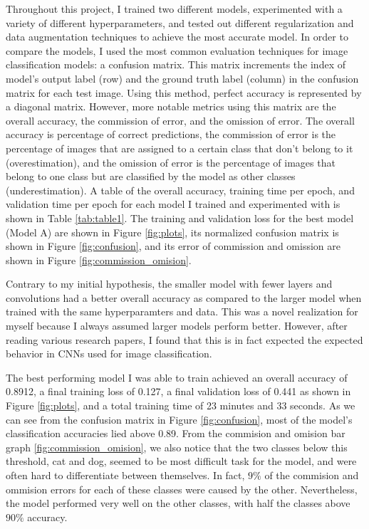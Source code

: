 \documentclass[11pt,a4paper]{article}
\begin{document}
Throughout this project, I trained two different models, experimented with a variety of different hyperparameters,
 and tested out different regularization and data augmentation techniques to achieve the most accurate model. In order 
 to compare the models, I used the most common evaluation techniques for image classification models: a confusion matrix. 
 This matrix increments the index of model's output label (row) and the ground truth label (column) in the confusion matrix for each test image. Using this
 method, perfect accuracy is represented by a diagonal matrix. However, more notable metrics using this matrix are the 
 overall accuracy, the commission of error, and the omission of error. The overall accuracy is percentage of correct 
 predictions, the commission of error is the percentage of images that are assigned to a certain class that don't belong 
 to it (overestimation), and the omission of error is the percentage of images that belong to one class but are classified by the model 
 as other classes (underestimation). A table of the overall accuracy, training time per epoch, and validation time per epoch 
 for each model I trained and experimented with is shown in Table \ref{tab:table1}. The training and validation loss for the best model (Model A)
 are shown in Figure \ref{fig:plots}, its normalized confusion matrix is shown in Figure \ref{fig:confusion}, and its error of commission
  and omission are shown in Figure \ref{fig:commission_omision}.

Contrary to my initial hypothesis, the smaller model with fewer layers and convolutions had a better overall accuracy as compared to the larger model 
 when trained with the same hyperparamters and data. This was a novel realization for myself because I always assumed larger models perform better. However, after reading 
 various research papers, I found that this is in fact expected the expected behavior in CNNs used for image classification. 

The best performing model I was able to train achieved an overall accuracy of 0.8912, a final training loss of 0.127, a final validation loss of 0.441 as shown in Figure \ref{fig:plots}, and a total training time of 23 minutes and 33 seconds.
  As we can see from the confusion matrix in Figure \ref{fig:confusion}, most of the model's classification accuracies lied above 0.89. From the commision and omision bar graph
   \ref{fig:commission_omision}, we also notice that the two classes below this threshold, cat and dog, seemed to be most difficult task for the model, and were often hard to differentiate between themselves.
   In fact, $9\%$ of the commision and ommision errors for each of these classes were caused by the other. Nevertheless, the model performed very well on the other classes, with half the classes
   above $90\%$ accuracy.
\end{document}

